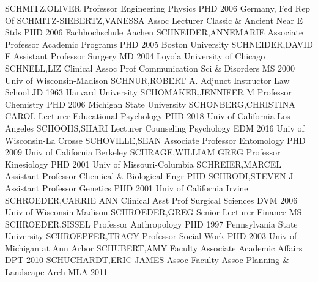 \documentclass[
]{article}
\begin{document}
\textbar{}  \textbar SCHMITZ,OLIVER \textbar Professor
\textbar Engineering Physics \textbar PHD 2006 Germany, Fed Rep Of
\textbar{}  \textbar SCHMITZ-SIEBERTZ,VANESSA \textbar Assoc
Lecturer \textbar Classic \& Ancient Near E Stds \textbar PHD 2006
Fachhochschule Aachen \textbar{} 
\textbar SCHNEIDER,ANNEMARIE \textbar Associate Professor
\textbar Academic Programs \textbar PHD 2005 Boston University
\textbar{}  \textbar SCHNEIDER,DAVID F \textbar Assistant
Professor \textbar Surgery \textbar MD 2004 Loyola University of Chicago
\textbar{}  \textbar SCHNELL,LIZ \textbar Clinical Assoc
Prof \textbar Communication Sci \& Disorders \textbar MS 2000 Univ of
Wisconsin-Madison \textbar{}  \textbar SCHNUR,ROBERT A.
\textbar Adjunct Instructor \textbar Law School \textbar JD 1963 Harvard
University \textbar{}  \textbar SCHOMAKER,JENNIFER M
\textbar Professor \textbar Chemistry \textbar PHD 2006 Michigan State
University \textbar{}  \textbar SCHONBERG,CHRISTINA CAROL
\textbar Lecturer \textbar Educational Psychology \textbar PHD 2018 Univ
of California Los Angeles \textbar{}  \textbar SCHOOHS,SHARI
\textbar Lecturer \textbar Counseling Psychology \textbar EDM 2016 Univ
of Wisconsin-La Crosse \textbar{}  \textbar SCHOVILLE,SEAN
\textbar Associate Professor \textbar Entomology \textbar PHD 2009 Univ
of California Berkeley \textbar{}  \textbar SCHRAGE,WILLIAM
GREG \textbar Professor \textbar Kinesiology \textbar PHD 2001 Univ of
Missouri-Columbia \textbar{}  \textbar SCHREIER,MARCEL
\textbar Assistant Professor \textbar Chemical \& Biological Engr
\textbar PHD \textbar{}  \textbar SCHRODI,STEVEN J
\textbar Assistant Professor \textbar Genetics \textbar PHD 2001 Univ of
California Irvine \textbar{}  \textbar SCHROEDER,CARRIE ANN
\textbar Clinical Asst Prof \textbar Surgical Sciences \textbar DVM 2006
Univ of Wisconsin-Madison \textbar{} 
\textbar SCHROEDER,GREG \textbar Senior Lecturer \textbar Finance
\textbar MS \textbar{}  \textbar SCHROEDER,SISSEL
\textbar Professor \textbar Anthropology \textbar PHD 1997 Pennsylvania
State University \textbar{}  \textbar SCHROEPFER,TRACY
\textbar Professor \textbar Social Work \textbar PHD 2003 Univ of
Michigan at Ann Arbor \textbar{}  \textbar SCHUBERT,AMY
\textbar Faculty Associate \textbar Academic Affairs \textbar DPT 2010
\textbar{}  \textbar SCHUCHARDT,ERIC JAMES \textbar Assoc
Faculty Assoc \textbar Planning \& Landscape Arch \textbar MLA 2011
\end{document}

